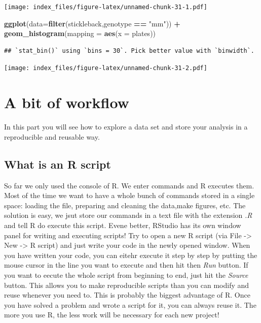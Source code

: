 \documentclass[]{article}
\newenvironment{Shaded}{\begin{snugshade}}{\end{snugshade}}
\newcommand{\DataTypeTok}[1]{\textcolor[rgb]{0.13,0.29,0.53}{#1}}
\newcommand{\KeywordTok}[1]{\textcolor[rgb]{0.13,0.29,0.53}{\textbf{#1}}}
\newcommand{\NormalTok}[1]{#1}
\newcommand{\OperatorTok}[1]{\textcolor[rgb]{0.81,0.36,0.00}{\textbf{#1}}}
\newcommand{\StringTok}[1]{\textcolor[rgb]{0.31,0.60,0.02}{#1}}
\begin{document}
\texttt{[image: index\_files/figure-latex/unnamed-chunk-31-1.pdf]}

\begin{Shaded}
\begin{Highlighting}[]
\KeywordTok{ggplot}\NormalTok{(}\DataTypeTok{data=}\KeywordTok{filter}\NormalTok{(stickleback,genotype }\OperatorTok{==}\StringTok{ "mm"}\NormalTok{)) }\OperatorTok{+}\StringTok{ }
\StringTok{  }\KeywordTok{geom_histogram}\NormalTok{(}\DataTypeTok{mapping =} \KeywordTok{aes}\NormalTok{(}\DataTypeTok{x =}\NormalTok{ plates))}
\end{Highlighting}
\end{Shaded}

\begin{verbatim}
## `stat_bin()` using `bins = 30`. Pick better value with `binwidth`.
\end{verbatim}

\texttt{[image: index\_files/figure-latex/unnamed-chunk-31-2.pdf]}

\hypertarget{a-bit-of-workflow}{%
\section{A bit of workflow}\label{a-bit-of-workflow}}

In this part you will see how to explore a data set and store your
analysis in a reproducible and reusable way.

\hypertarget{what-is-an-r-script}{%
\subsection{What is an R script}\label{what-is-an-r-script}}

So far we only used the console of R. We enter commands and R executes
them. Most of the time we want to have a whole bunch of commands stored
in a single space: loading the file, preparing and cleaning the
data,make figures, etc. The solution is easy, we jsut store our commands
in a text file with the extension \emph{.R} and tell R do execute this
script. Evene better, RStudio has its own window panel for writing and
executing scripts! Try to open a new R script (via File -\textgreater{}
New -\textgreater{} R script) and just write your code in the newly
opened window. When you have written your code, you can eitehr execute
it step by step by putting the mouse cursor in the line you want to
execute and then hit then \emph{Run} button. If you want to eecute the
whole script from beginning to end, just hit the \emph{Source} button.
This allows you to make reproducible scripts than you can modify and
reuse whenever you need to. This is probably the biggest advantage of R.
Once you have solved a problem and wrote a script for it, you can always
reuse it. The more you use R, the less work will be necessary for each
new project!
\end{document}
